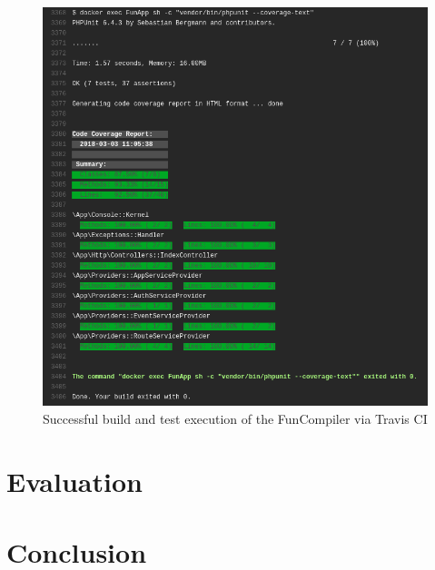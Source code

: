 \documentclass{l4proj}
\begin{document}
\begin{figure}[h]
\centering
\includegraphics[scale=0.3]{images/citests.png}
\caption{Successful build and test execution of the FunCompiler via Travis CI}
\label{fig:citests}	
\end{figure}

\chapter{Evaluation}
\chapter{Conclusion}
  

\end{document}
